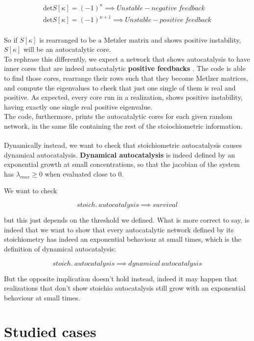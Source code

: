 \documentclass{article}
\begin{document}
\begin{equation*}
    \begin{align*}
        \textrm{det}S[\kappa] = (-1)^{\kappa} \implies Unstable-negative \ feedback\\
         \textrm{det}S[\kappa] = (-1)^{\kappa+1} \implies Unstable-positive \ feedback
    \end{align*}
\end{equation*}
\\
So if $S[\kappa]$ is rearranged to be a Metzler matrix and shows positive instability, $S[\kappa]$ will be an autocatalytic core. 
\\
To rephrase this differently, we expect a network that shows autocatalysis to have inner cores that are indeed autocatalytic \textbf{positive feedbacks} \cite{1}. The code is able to find those cores, rearrange their rows such that they become Metlzer matrices, and compute the eigenvalues to check that just one single of them is real and positive. As expected, every core run in a realization, shows positive instability, having exactly one single real positive eigenvalue.
\\
The code, furthermore, prints the autocatalytic cores for each given random network, in the same file containing the rest of the stoiochiometric information.
\\
\\
Dynamically instead, we want to check that stoichiometric autocatalysis causes dynamical autocatalysis. \textbf{Dynamical autocatalysis} is indeed defined by an exponential growth at small concentrations, so that the jacobian of the system has $\lambda_{max} \ge 0$ when evaluated close to 0.

We want to check 

$$stoich. \ autocatalysis \implies survival$$

but this just depends on the threshold we defined. What is more correct to say, is indeed that we want to show that every autocatalytic network defined by its stoichiometry has indeed an exponential behaviour at small times, which is the definition of dynamical autocatalysis:

$$stoich. \ autocatalysis \implies dynamical \ autocatalysis$$

But the opposite implication doesn't hold instead, indeed it may happen that realizations that don't show stoichio autocatalysis still grow with an exponential behaviour at small times. 



\section{Studied cases}
\end{document}
